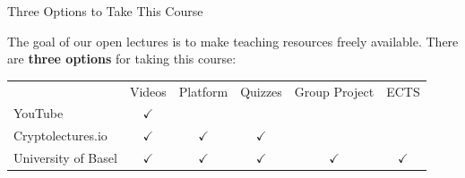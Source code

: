 \documentclass[]{beamer}
\begin{document}
\begin{frame}{Three Options to Take This Course}

The goal of our open lectures is to make teaching resources freely available. There are \color{focus} \textbf{three options} \color{black} for taking this course:\vspace{1em}

\begin{table}\footnotesize
	\begin{tabular}{lccccc}
	\hline \hline
									& Videos 		& Platform 		& Quizzes  		& Group Project	& ECTS 			\\ \cline{2-6}
		YouTube 	 				& $\checkmark$	& 				& 				& 				&				\\
		Cryptolectures.io 			& $\checkmark$	& $\checkmark$	& $\checkmark$	&				&				\\
		University of Basel			& $\checkmark$	& $\checkmark$	& $\checkmark$	& $\checkmark$	&$\checkmark$	\\
		\hline \hline
	\end{tabular}
\end{table} \vspace{2em}


\end{frame}
\end{document}
